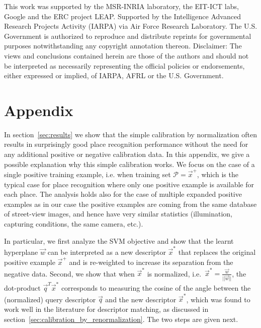 \begin{acknowledgements}
   This work was supported by the MSR-INRIA laboratory, the EIT-ICT labs, Google and the ERC project LEAP.
   {
   \noindent
   Supported by the Intelligence Advanced Research Projects Activity (IARPA) via Air Force Research Laboratory. The U.S. Government is authorized to reproduce and distribute reprints for governmental purposes notwithstanding any copyright annotation thereon. Disclaimer:  The views and conclusions contained herein are those of the authors and should not be interpreted as necessarily representing the official policies or endorsements, either expressed or implied, of IARPA, AFRL or the U.S. Government.
   }
\end{acknowledgements}




{\footnotesize

}

  \section*{Appendix} %
    In section~\ref{sec:results} we show that the simple calibration by normalization often results in surprisingly good place recognition performance without the need for any additional positive or negative calibration data. In this \textcolor{petr}{appendix}, we give a possible explanation why this simple calibration works.  We focus on the case of a single positive training example, i.e. when training set $\mathcal P = \vec{x}^{+}$, which is the typical case for place recognition where only one 
    \textcolor{petr}{positive example is available for each place. The analysis holds also for the case of multiple expanded positive examples as in our case the positive examples are coming from the same database of street-view images, and hence have very similar statistics (illumination, capturing conditions, the same camera, etc.)}. 

    In particular, we first analyze the SVM objective and show that the learnt hyperplane $\vec{w}$ can be interpreted as a new descriptor $\vec{x}^{*}$ that replaces the original positive example $\vec{x}^{+}$ and is re-weighted to increase its separation from the negative data. 
    Second, we show that when $\vec{x}^{*}$ is normalized, i.e.\  $\vec{x}^{*} = \frac{\vec{w}}{||\vec{w}||}$, the dot-product $\vec{q}^T\vec{x}^*$ corresponds to measuring the cosine of the angle between the (normalized) query descriptor $\vec{q}$  and the new descriptor $\vec{x}^{*}$, which was found to work well in the literature for descriptor matching, as discussed in section~\ref{sec:calibration_by_renormalization}. The two steps are given next.  
    
